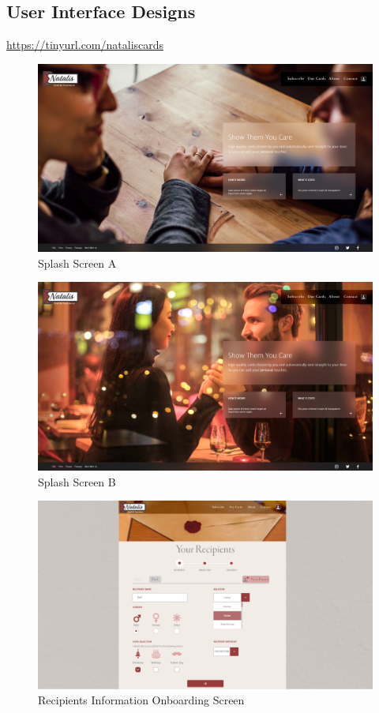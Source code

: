 \documentclass[10pt,a4paper]{article}
\begin{document}
\begin{appendices}
\clearpage

\section{User Interface Designs}
\label{sec:UI_design}
\href{https://tinyurl.com/nataliscards}{https://tinyurl.com/nataliscards}
  \begin{figure}[!htb]
\includegraphics[width=1.0\linewidth]{splash_1.png}
    \caption{Splash Screen A}
  \end{figure}

  \begin{figure}[!htb]
  \label{splashscreenb}
\includegraphics[width=1.0\linewidth]{splash_2.png}
    \caption{Splash Screen B}
  \end{figure}

  \begin{figure}[!htb]
\includegraphics[width=1.0\linewidth]{recipients.png}
    \caption{Recipients Information Onboarding Screen}
  \end{figure}


\end{appendices}
\end{document}
